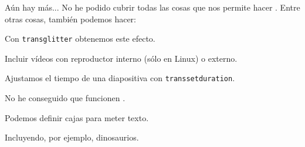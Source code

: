\begin{frame}{Aún hay más...}
  No he podido cubrir todas las cosas que nos permite hacer \beamer \frownie{}.
  Entre otras cosas, también podemos hacer:
  \espacio
  \begin{description}[<+->]
    \item[Transiciones] Con \texttt{transglitter} obtenemos este efecto.
    \item[Multimedia] Incluir vídeos con reproductor interno (sólo en Linux) o externo.
    \item[Temporización] Ajustamos el tiempo de una diapositiva con \texttt{transsetduration}.
    \item[Animaciones] No he conseguido que funcionen \frownie{}.
    \item[Cajas] Podemos definir cajas para meter texto.
    \item[Overlays de imágenes] Incluyendo, por ejemplo, dinosaurios.
  \end{description}
  \espacio

\end{frame}
